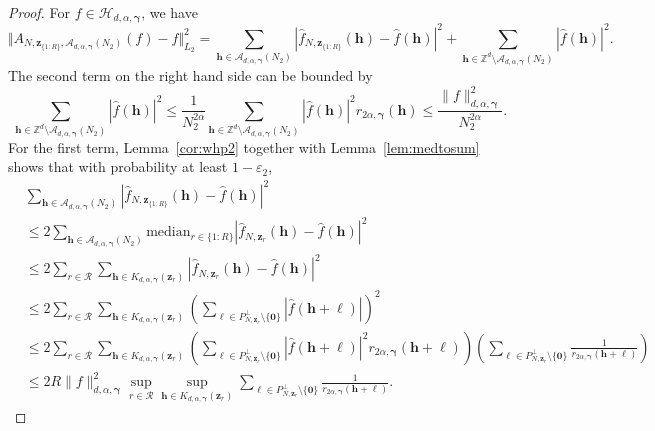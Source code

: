 \documentclass[10pt,a4paper]{amsart}
\newcommand{\Acal}{\mathcal{A}}
\newcommand{\Hcal}{\mathcal{H}}
\newcommand{\ZZ}{\mathbb{Z}}
\newcommand{\abs}[1]{\left\vert#1\right\vert}
\newcommand{\bsgamma}{\boldsymbol{\gamma}}
\newcommand{\bsh}{\boldsymbol{h}}
\newcommand{\bsl}{\boldsymbol{\ell}}
\newcommand{\bsz}{\boldsymbol{z}}
\newcommand{\bszero}{\boldsymbol{0}}
\begin{document}
\begin{proof}
     For $f\in \Hcal_{d,\alpha,\bsgamma}$, we have
    \begin{equation}\label{eqn:L2errordecomp}
         \Vert A_{N,\bsz_{\{1{:}R\}},\Acal_{d,\alpha,\bsgamma}(N_2)}(f)-f\Vert^2_{L_2} = \sum_{\bsh\in \Acal_{d,\alpha,\bsgamma}(N_2)} \abs{\widehat{f}_{N,\bsz_{\{1{:}R\}}}(\bsh)-\widehat{f}({\bsh})}^2+\sum_{\bsh\in \ZZ^d\setminus\Acal_{d,\alpha,\bsgamma}(N_2)} \abs{\widehat{f}({\bsh})}^2.
    \end{equation}
    The second term on the right hand side can be bounded by
    \begin{equation*}
        \sum_{\bsh\in \ZZ^d\setminus\Acal_{d,\alpha,\bsgamma}(N_2)} \abs{\widehat{f}({\bsh})}^2\leq \frac{1}{N^{2\alpha}_2}\sum_{\bsh\in \ZZ^d\setminus\Acal_{d,\alpha,\bsgamma}(N_2)} \abs{\widehat{f}({\bsh})}^2r_{2\alpha,\bsgamma}(\bsh)\leq  \frac{\|f\|^2_{d,\alpha,\bsgamma}}{N^{2\alpha}_2}.
    \end{equation*}
    For the first term, Lemma~\ref{cor:whp2} together with Lemma~\ref{lem:medtosum} shows that with probability at least $1-\varepsilon_2$, 
        \begin{align*}
         & \sum_{\bsh\in \Acal_{d,\alpha,\bsgamma}(N_2)} \abs{\widehat{f}_{N,\bsz_{\{1{:}R\}}}(\bsh)-\widehat{f}({\bsh})}^2 \\
         & \leq 2\sum_{\bsh\in \Acal_{d,\alpha,\bsgamma}(N_2)}  \mathrm{median}_{r\in\{1{:}R\}} \abs{\widehat{f}_{N,\bsz_r}(\bsh)-\widehat{f}({\bsh})}^2 \\
         & \leq 2 \sum_{r\in\mathcal{R}} \sum_{\bsh\in K_{d,\alpha,\bsgamma}(\bsz_r)} \abs{\widehat{f}_{N,\bsz_r}(\bsh)-\widehat{f}({\bsh})}^2\\
         & \leq 2  \sum_{r\in\mathcal{R}} \sum_{\bsh\in K_{d,\alpha,\bsgamma}(\bsz_r)} \left(\sum_{\bsl\in P^\perp_{N,\bsz_r}\setminus\{\bszero\} } \abs{\widehat{f}({\bsh+\bsl})}\right)^2 \\
         & \leq 2  \sum_{r\in\mathcal{R}} \sum_{\bsh\in K_{d,\alpha,\bsgamma}(\bsz_r)} \left(\sum_{\bsl\in P^\perp_{N,\bsz_r}\setminus\{\bszero\} } \abs{\widehat{f}({\bsh+\bsl})}^2 r_{2\alpha,\bsgamma}(\bsh+\bsl) \right) \left(\sum_{\bsl\in P^\perp_{N,\bsz_r}\setminus\{\bszero\} }\frac{1}{r_{2\alpha,\bsgamma}(\bsh+\bsl)} \right)\\
         & \leq 2 R \|f\|^2_{d,\alpha,\bsgamma}  \sup_{r \in \mathcal{R} }\sup_{\bsh\in K_{d,\alpha,\bsgamma}(\bsz_r)} \sum_{\bsl\in P^\perp_{N,\bsz_r}\setminus\{\bszero\} }\frac{1}{r_{2\alpha,\bsgamma}(\bsh+\bsl)}.
    \end{align*}

\end{proof}
\end{document}
